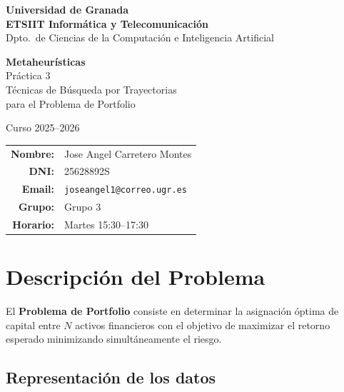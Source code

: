 \documentclass[12pt,a4paper]{article}
\begin{document}
\begin{titlepage}
  \centering
  \vspace*{2cm}
  {\Large \textbf{Universidad de Granada}\\[0.3cm]
          \textbf{ETSIIT Informática y Telecomunicación}\\[0.3cm]
          Dpto.\ de Ciencias de la Computación e Inteligencia Artificial}
  \vspace{2.5cm}

  {\LARGE \textbf{Metaheurísticas}}\\[0.5cm]
  {\Large Práctica 3}\\[0.3cm]
  {\large Técnicas de Búsqueda por Trayectorias\\
           para el Problema de Portfolio}

  \vspace{1.5cm}
  {\large Curso 2025--2026}

  \vfill
  \begin{tabular}{rl}
    \textbf{Nombre:}  & Jose Angel Carretero Montes \\[4pt]
    \textbf{DNI:}     & 25628892S \\[4pt]
    \textbf{Email:}   & \texttt{joseangel1@correo.ugr.es} \\[4pt]
    \textbf{Grupo:}   & Grupo 3 \\[4pt]
    \textbf{Horario:} & Martes 15:30--17:30 \\
  \end{tabular}
  \vspace{1.5cm}
\end{titlepage}

\tableofcontents
\newpage

\section{Descripción del Problema}

El \textbf{Problema de Portfolio} consiste en determinar la asignación óptima de capital
entre $N$ activos financieros con el objetivo de maximizar el retorno esperado
minimizando simultáneamente el riesgo.

\subsection*{Representación de los datos}
\end{document}
